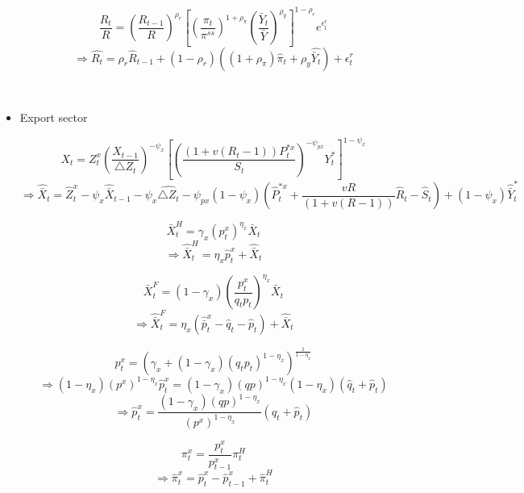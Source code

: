 \documentclass[11pt, a4paper]{article}
\begin{document}
\begin{itemize}
\[ \frac{R_t}{{R}} = \left( \frac{R_{t-1}}{{R}} \right) ^{\rho_r} \left[ \left(\frac{\pi_t}{{\pi}^{ss}} \right)^{1+\rho_{\pi}} \left(\frac{\bar{Y}_t}{\bar{Y}} \right)^{\rho_{y}} \right]^{1-\rho_r}e^{\epsilon_t^r} \]
\begin{equation} \Rightarrow \widehat{R_t} = \rho_r \widehat{R}_{t-1} + (1-\rho_r) \left(({1+\rho_{\pi}})\widehat{\pi}_t + \rho_y\widehat{\bar{Y}_t} \right) + {\epsilon_t^r} \end{equation}

~\\

\item Export sector

\[X_t = Z_t^x \left(\frac{X_{t-1}} {\bigtriangleup Z_t} \right)^{-\psi_x}\left[\left( \frac{(1+v(R_t-1))P_t^{*x}}{S_t} \right)^{-\psi_{px}}Y_t^* \right]^{1-\psi_x}\]
\begin{equation}
\Rightarrow \widehat{\bar{X}}_t = \widehat{Z}_t^x -\psi_x \widehat{\bar{X}}_{t-1} - \psi_x \widehat{{\bigtriangleup Z_t}} - \psi_{px} (1-\psi_x) \left(\widehat{P}_t^{*x}+ \frac{vR}{(1+v(R-1))}\widehat{R}_t - \widehat{S}_t \right) + (1-\psi_x) \widehat{\bar{Y}}_t^*  
\end{equation}

\[\bar{X}_t^H = \gamma_x (p_t^x)^{\eta_x} \bar{X}_t\]
\begin{equation}
\Rightarrow \widehat{\bar{X}}_t^H = \eta_x \widehat{p}_t^x + \widehat{\bar{X}}_t
\end{equation}

\[\bar{X}_t^F = (1-\gamma_x) \left( \frac{p_t^{x}}{q_t p_t} \right)^{\eta_x}\bar{X}_t\]
\begin{equation}
\Rightarrow \widehat{\bar{X}}_t^F = \eta_x \left(\widehat{\bar{p}}_t^{x} - \hat{q}_t - \hat{p}_t \right) + \widehat{\bar{X}}_t
\end{equation}

\[ p_t^x = \left(\gamma_x + (1-\gamma_x)(q_t p_t)^{1-\eta_x}\right)^{\frac{1}{1-\eta_x}}\]
\begin{equation*}
\Rightarrow (1-\eta_x)({p^{x}})^{1-\eta_x}\widehat{p}_t^x = (1-\gamma_x)(qp)^{1-\eta_x}(1-\eta_x)(\hat{q}_t + \hat{p}_t)
\end{equation*}
\begin{equation}
\Rightarrow \widehat{p}_t^x = \frac{(1-\gamma_x)(qp)^{1-\eta_x}}{({p^{x}})^{1-\eta_x}}(\hat{q}_t + \hat{p}_t)
\end{equation}

\[\pi_t^x = \frac{p_t^x}{p_{t-1}^x}\pi_t^H\]
\begin{equation}
\Rightarrow \widehat{\pi}_t^x = \widehat{p}_t^x -\widehat{p}_{t-1}^x + \hat{\pi}_t^H
\end{equation}


\end{itemize}
\end{document}
